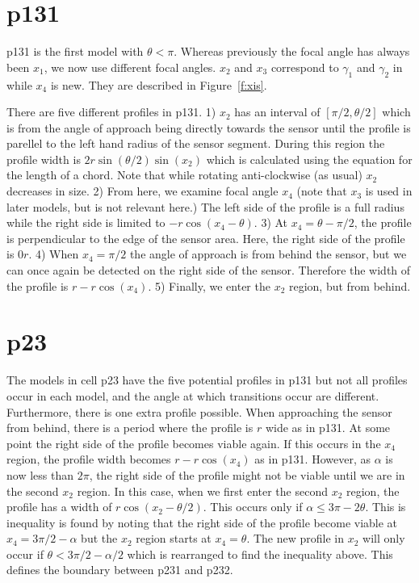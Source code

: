 \section{p131} \label{p131}

p131 is the first model with $\theta < \pi$. Whereas previously the focal angle has always been $x_1$, we now use different focal angles. $x_2$ and $x_3$ correspond to $\gamma_1$ and $\gamma_2$ in \cite{rowcliffe2008estimating} while $x_4$ is new. They are described in Figure~\ref{f:xis}. 

There are five different profiles in p131. 1) $x_2$ has an interval of $[\pi/2, \theta/2]$ which is from the angle of approach being directly towards the sensor until the profile is parellel to the left hand radius of the sensor segment. During this region the profile width is $2r\sin\left(\theta/2\right)\sin(x_2)$ which is calculated using the equation for the length of a chord. Note that while rotating anti-clockwise (as usual) $x_2$ decreases in size. 2) From here, we examine focal angle $x_4$ (note that $x_3$ is used in later models, but is not relevant here.)  The left side of the profile is a full radius while the right side is limited to $- r\cos(x_4 - \theta)$. 3) At $x_4 =  \theta - \pi/2$, the profile is perpendicular to the edge of the sensor area. Here, the right side of the profile is $0r$. 4) When $x_4 = \pi/2$ the angle of approach is from behind the sensor, but we can once again be detected on the right side of the sensor. Therefore the width of the profile is $r - r\cos(x_4)$. 5) Finally, we enter the $x_2$ region, but from behind. 



\section{p23} \label{p23}

The models in cell p23 have the five potential profiles in p131 but not all profiles occur in each model, and the angle at which transitions occur are different. Furthermore, there is one extra profile possible. When approaching the sensor from behind, there is a period where the profile is $r$ wide as in p131. At some point the right side of the profile becomes viable again. If this occurs in the $x_4$ region, the profile width becomes  $r - r\cos(x_4)$ as in p131. However, as $\alpha$ is now less than $2\pi$, the right side of the profile might not be viable until we are in the second $x_2$ region. In this case, when we first enter the second $x_2$ region, the profile has a width of $r\cos(x_2 - \theta/2)$. This occurs only if $\alpha \le 3\pi - 2\theta$. This is inequality is found by noting that the right side of the profile become viable at $x_4 = 3\pi/2 - \alpha$ but the $x_2$ region starts at $x_4 = \theta$. The new profile in $x_2$ will only occur if  $ \theta < 3\pi/2 - \alpha/2$ which is rearranged to find the inequality above. This defines the boundary between p231 and p232.

